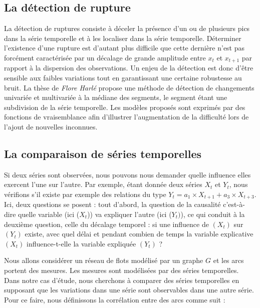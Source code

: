 \subsection{La d\'etection de rupture}
La d\'etection de ruptures consiste \`a d\'eceler la pr\'esence d'un ou de plusieurs pics dans la s\'erie temporelle et \`a les localiser dans la s\'erie temporelle. 
D\'eterminer l'existence d'une rupture est d'autant plus difficile que cette derni\`ere n'est pas forc\'ement caract\'eris\'ee par un d\'ecalage de grande amplitude entre $x_t$ et $x_{t+1}$ par rapport \`a la dispersion des observations. 
Un enjeu de la d\'etection est donc d'\^etre sensible aux faibles variations tout en garantissant une certaine robustesse au bruit.
La th\`ese  de {\em Flore Harl\'e} \cite{floreHarleDetectionRuptureMultiples2006} 
propose une m\'ethode de d\'etection de changements univari\'ee et multivari\'ee \`a la m\'ediane des segments, le segment \'etant une subdivision de la s\'erie temporelle. Les mod\`eles propos\'es sont exprim\'es par des fonctions de vraisemblance afin d'illustrer l'augmentation de la difficult\'e lors de l'ajout de nouvelles inconnues.

\subsection{La comparaison de  s\'eries temporelles}
Si deux s\'eries sont observ\'ees, nous pouvons nous demander quelle influence elles exercent l'une sur l'autre. 
Par exemple, \'etant donn\'ee deux s\'eries $X_t$ et $Y_t$, nous v\'erifions s'il existe par exemple des relations du type
$Y_t = a_1 \times X_{t+1} + a_3 \times X_{t+3}. $
\newline
Ici, deux questions se posent : tout d'abord, la question de la causalit\'e c'est-\`a-dire quelle variable (ici ($X_t$)) va expliquer l'autre (ici ($Y_t)$), ce qui conduit \`a la deuxi\`eme question, celle du d\'ecalage temporel : si une influence de $(X_t)$ sur $(Y_t)$ existe, avec quel d\'elai et pendant combien de temps la variable explicative $(X_t)$ influence-t-elle la variable expliqu\'ee $(Y_t)$ ?
\newline

Nous allons consid\'erer un r\'eseau de flots mod\'elis\'e par un graphe $G$ et les arcs portent des mesures. Les mesures sont mod\'elis\'ees par des s\'eries temporelles.
Dans notre cas d'\'etude, nous cherchons \`a comparer des s\'eries temporelles en supposant que les variations dans une s\'erie sont observables dans une autre s\'erie. Pour ce faire, nous d\'efinissons la corr\'elation entre des arcs comme suit : 

